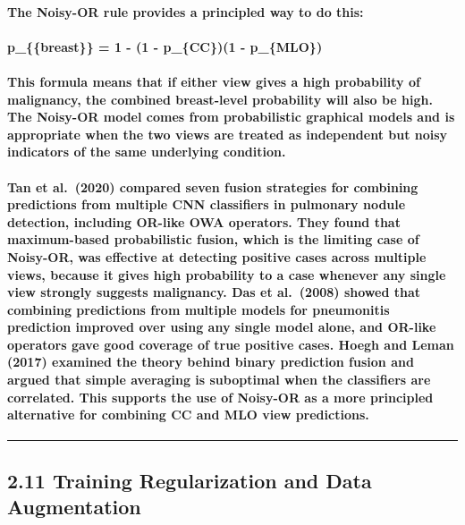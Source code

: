 \paragraph{The Noisy-OR rule provides a principled way to do this:}

\paragraph{p\_\{\text\{breast\}\} = 1 - (1 - p\_\{CC\})(1 - p\_\{MLO\})}

\paragraph{This formula means that if either view gives a high probability of malignancy, the combined breast-level probability will also be high. The Noisy-OR model comes from probabilistic graphical models and is appropriate when the two views are treated as independent but noisy indicators of the same underlying condition.}

\paragraph{Tan et al. (2020) compared seven fusion strategies for combining predictions from multiple CNN classifiers in pulmonary nodule detection, including OR-like OWA operators. They found that maximum-based probabilistic fusion, which is the limiting case of Noisy-OR, was effective at detecting positive cases across multiple views, because it gives high probability to a case whenever any single view strongly suggests malignancy. Das et al. (2008) showed that combining predictions from multiple models for pneumonitis prediction improved over using any single model alone, and OR-like operators gave good coverage of true positive cases. Hoegh and Leman (2017) examined the theory behind binary prediction fusion and argued that simple averaging is suboptimal when the classifiers are correlated. This supports the use of Noisy-OR as a more principled alternative for combining CC and MLO view predictions.}

\begin{center}\rule{0.5\linewidth}{0.5pt}\end{center}

\subsection{2.11 Training Regularization and Data
Augmentation}\label{training-regularization-and-data-augmentation}

